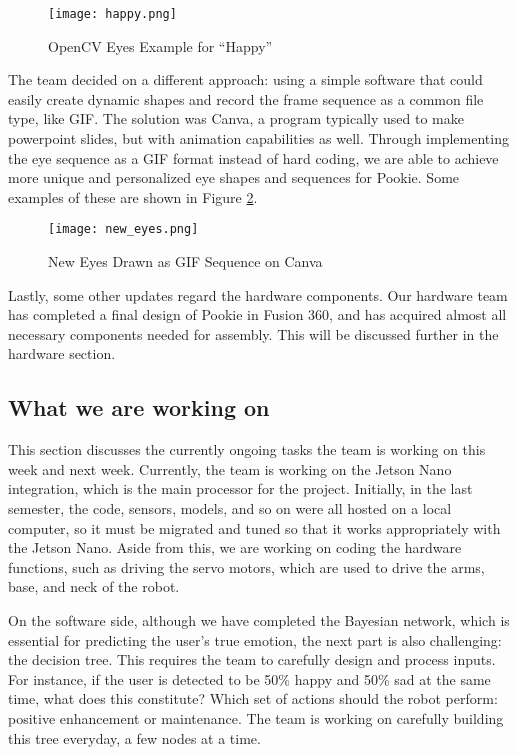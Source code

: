 \begin{figure}[ht]
    \centering
    \texttt{[image: happy.png]}
    \caption{OpenCV Eyes Example for “Happy”}
    \label{fig:happy}
\end{figure}

The team decided on a different approach: using a simple software that could easily create dynamic shapes and record the frame sequence as a common file type, like GIF. The solution was Canva, a program typically used to make powerpoint slides, but with animation capabilities as well. Through implementing the eye sequence as a GIF format instead of hard coding, we are able to achieve more unique and personalized eye shapes and sequences for Pookie. Some examples of these are shown in Figure \ref{fig:new_eyes}.

\begin{figure}[ht]
    \centering
    \texttt{[image: new\_eyes.png]}
    \caption{New Eyes Drawn as GIF Sequence on Canva}
    \label{fig:new_eyes}
\end{figure}

\newpage
Lastly, some other updates regard the hardware components. Our hardware team has completed a final design of Pookie in Fusion 360, and has acquired almost all necessary components needed for assembly. This will be discussed further in the hardware section.

\subsection{What we are working on}
This section discusses the currently ongoing tasks the team is working on this week and next week. Currently, the team is working on the Jetson Nano integration, which is the main processor for the project. Initially, in the last semester, the code, sensors, models, and so on were all hosted on a local computer, so it must be migrated and tuned so that it works appropriately with the Jetson Nano. Aside from this, we are working on coding the hardware functions, such as driving the servo motors, which are used to drive the arms, base, and neck of the robot. 

On the software side, although we have completed the Bayesian network, which is essential for predicting the user’s true emotion, the next part is also challenging: the decision tree. This requires the team to carefully design and process inputs. For instance, if the user is detected to be 50\% happy and 50\% sad at the same time, what does this constitute? Which set of actions should the robot perform: positive enhancement or maintenance. The team is working on carefully building this tree everyday, a few nodes at a time.

